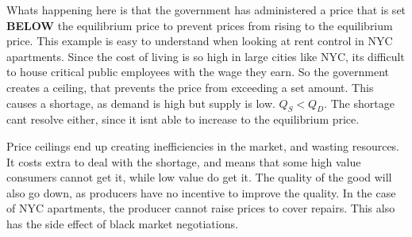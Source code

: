 Whats happening here is that the government has administered a price that is set \textbf{BELOW} the equilibrium price to prevent prices from rising to the equilibrium price. This example is easy to understand when looking at rent control in NYC apartments. Since the cost of living is so high in large cities like NYC, its difficult to house critical public employees with the wage they earn. So the government creates a ceiling, that prevents the price from exceeding a set amount. This causes a shortage, as demand is high but supply is low. $Q_S < Q_D$. The shortage cant resolve either, since it isnt able to increase to the equilibrium price.

Price ceilings end up creating inefficiencies in the market, and wasting resources. It costs extra to deal with the shortage, and means that some high value consumers cannot get it, while low value do get it. The quality of the good will also go down, as producers have no incentive to improve the quality. In the case of NYC apartments, the producer cannot raise prices to cover repairs. This also has the side effect of black market negotiations. 

